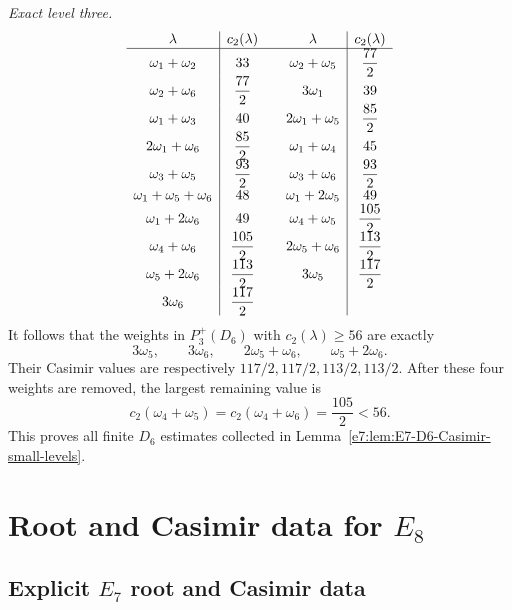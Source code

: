 \documentclass[11pt,reqno]{amsart}
\theoremstyle{definition}
\theoremstyle{remark}
\begin{document}
\medskip\noindent\emph{Exact level three.}
\begin{equation*}
\begin{array}{c|c@{\qquad}c|c}
  \lambda&c_2(\lambda)&\lambda&c_2(\lambda)\\
  \hline
  \omega_1+\omega_2&33
  &\omega_2+\omega_5&\dfrac{77}{2}\\[1mm]
  \omega_2+\omega_6&\dfrac{77}{2}
  &3\omega_1&39\\
  \omega_1+\omega_3&40
  &2\omega_1+\omega_5&\dfrac{85}{2}\\[1mm]
  2\omega_1+\omega_6&\dfrac{85}{2}
  &\omega_1+\omega_4&45\\
  \omega_3+\omega_5&\dfrac{93}{2}
  &\omega_3+\omega_6&\dfrac{93}{2}\\[1mm]
  \omega_1+\omega_5+\omega_6&48
  &\omega_1+2\omega_5&49\\
  \omega_1+2\omega_6&49
  &\omega_4+\omega_5&\dfrac{105}{2}\\[1mm]
  \omega_4+\omega_6&\dfrac{105}{2}
  &2\omega_5+\omega_6&\dfrac{113}{2}\\[1mm]
  \omega_5+2\omega_6&\dfrac{113}{2}
  &3\omega_5&\dfrac{117}{2}\\[1mm]
  3\omega_6&\dfrac{117}{2}
  &&
\end{array}
\end{equation*}
It follows that the weights in $P_3^+(D_6)$ with
$c_2(\lambda)\ge56$ are exactly
\begin{equation*}
  3\omega_5,
  \qquad
  3\omega_6,
  \qquad
  2\omega_5+\omega_6,
  \qquad
  \omega_5+2\omega_6.
\end{equation*}
Their Casimir values are respectively $117/2,117/2,113/2,113/2$.
After these four weights are removed, the largest remaining value is
\begin{equation*}
  c_2(\omega_4+\omega_5)
  =c_2(\omega_4+\omega_6)
  =\frac{105}{2}<56.
\end{equation*}
This proves all finite $D_6$ estimates collected in
Lemma~\ref{e7:lem:E7-D6-Casimir-small-levels}.
\section{Root and Casimir data for \texorpdfstring{$E_8$}{E8}}


\subsection{Explicit \texorpdfstring{$E_{7}$}{E7} root and Casimir data}
\label{e8:app:E8-E7-Casimir-data}
\end{document}
